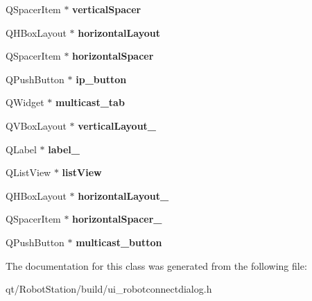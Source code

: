 \begin{DoxyCompactItemize}
\item 
\hypertarget{classUi__RobotConnectDialog_a785d5f08f5aaa596ad50cf3e2e9dd2bb}{}Q\+Spacer\+Item $\ast$ {\bfseries vertical\+Spacer}\label{classUi__RobotConnectDialog_a785d5f08f5aaa596ad50cf3e2e9dd2bb}

\item 
\hypertarget{classUi__RobotConnectDialog_a6342c327401d66f955c081c61817137a}{}Q\+H\+Box\+Layout $\ast$ {\bfseries horizontal\+Layout}\label{classUi__RobotConnectDialog_a6342c327401d66f955c081c61817137a}

\item 
\hypertarget{classUi__RobotConnectDialog_a905b9b5570a38625704fcbd9d1965160}{}Q\+Spacer\+Item $\ast$ {\bfseries horizontal\+Spacer}\label{classUi__RobotConnectDialog_a905b9b5570a38625704fcbd9d1965160}

\item 
\hypertarget{classUi__RobotConnectDialog_a4e95d3d3a674dacbbf0bb1d32a0d1fd5}{}Q\+Push\+Button $\ast$ {\bfseries ip\+\_\+button}\label{classUi__RobotConnectDialog_a4e95d3d3a674dacbbf0bb1d32a0d1fd5}

\item 
\hypertarget{classUi__RobotConnectDialog_aadccf8e2748e1faf921dc44a7de47d32}{}Q\+Widget $\ast$ {\bfseries multicast\+\_\+tab}\label{classUi__RobotConnectDialog_aadccf8e2748e1faf921dc44a7de47d32}

\item 
\hypertarget{classUi__RobotConnectDialog_a5cadc9362ad4faeb26bc0ae8c7d38be0}{}Q\+V\+Box\+Layout $\ast$ {\bfseries vertical\+Layout\+\_}\label{classUi__RobotConnectDialog_a5cadc9362ad4faeb26bc0ae8c7d38be0}

\item 
\hypertarget{classUi__RobotConnectDialog_abb33148cd10ae2082a6c61dae283da71}{}Q\+Label $\ast$ {\bfseries label\+\_}\label{classUi__RobotConnectDialog_abb33148cd10ae2082a6c61dae283da71}

\item 
\hypertarget{classUi__RobotConnectDialog_afa03a323647133f82b7e3969e082f59d}{}Q\+List\+View $\ast$ {\bfseries list\+View}\label{classUi__RobotConnectDialog_afa03a323647133f82b7e3969e082f59d}

\item 
\hypertarget{classUi__RobotConnectDialog_ad0d261340d2070ae9001ca82620b146a}{}Q\+H\+Box\+Layout $\ast$ {\bfseries horizontal\+Layout\+\_}\label{classUi__RobotConnectDialog_ad0d261340d2070ae9001ca82620b146a}

\item 
\hypertarget{classUi__RobotConnectDialog_afe90b2289121449cccc81dcd8d19ab89}{}Q\+Spacer\+Item $\ast$ {\bfseries horizontal\+Spacer\+\_}\label{classUi__RobotConnectDialog_afe90b2289121449cccc81dcd8d19ab89}

\item 
\hypertarget{classUi__RobotConnectDialog_a3fb2a63daac3e59200a2889656b9af52}{}Q\+Push\+Button $\ast$ {\bfseries multicast\+\_\+button}\label{classUi__RobotConnectDialog_a3fb2a63daac3e59200a2889656b9af52}

\end{DoxyCompactItemize}


The documentation for this class was generated from the following file\+:\begin{DoxyCompactItemize}
\item 
qt/\+Robot\+Station/build/ui\+\_\+robotconnectdialog.\+h\end{DoxyCompactItemize}
